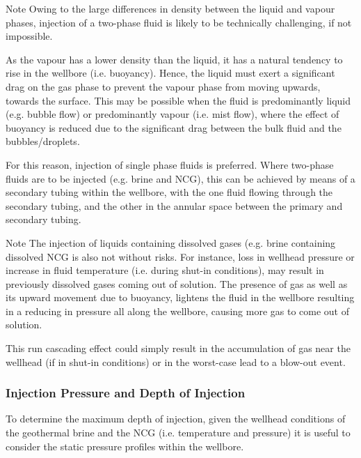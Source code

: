     \begin{notes}{Note}
        Owing to the large differences in density between the liquid and vapour phases, injection of a two-phase fluid is likely to be technically challenging, if not impossible.

        As the vapour has a lower density than the liquid, it has a natural tendency to rise in the wellbore (i.e. buoyancy). Hence, the liquid must exert a significant drag on the gas phase to prevent the vapour phase from moving upwards, towards the surface. This may be possible when the fluid is predominantly liquid (e.g. bubble flow) or predominantly vapour (i.e. mist flow), where the effect of buoyancy is reduced due to the significant drag between the bulk fluid and the bubbles/droplets. 
        
        For this reason, injection of single phase fluids is preferred. Where two-phase fluids are to be injected (e.g. brine and \ac{NCG}), this can be achieved by means of a secondary tubing within the wellbore, with the one fluid flowing through the secondary tubing, and the other in the annular space between the primary and secondary tubing.  
    \end{notes}

    \begin{notes}{Note}
        The injection of liquids containing dissolved gases (e.g. brine containing dissolved \ac{NCG} is also not without risks. For instance, loss in wellhead pressure or increase in fluid temperature (i.e. during shut-in conditions), may result in previously dissolved gases coming out of solution. The presence of gas as well as its upward movement due to buoyancy, lightens the fluid in the wellbore resulting in a reducing in pressure all along the wellbore, causing more gas to come out of solution.

        This run cascading effect could simply result in the accumulation of gas near the wellhead (if in shut-in conditions) or in the worst-case lead to a blow-out event.
    \end{notes}

    \subsubsection{Injection Pressure and Depth of Injection}
        \label{sec:prosim_NCGhandling_Pinj}
        To determine the maximum depth of injection, given the wellhead conditions of the geothermal brine and the \ac{NCG} (i.e. temperature and pressure) it is useful to consider the static pressure profiles within the wellbore.

